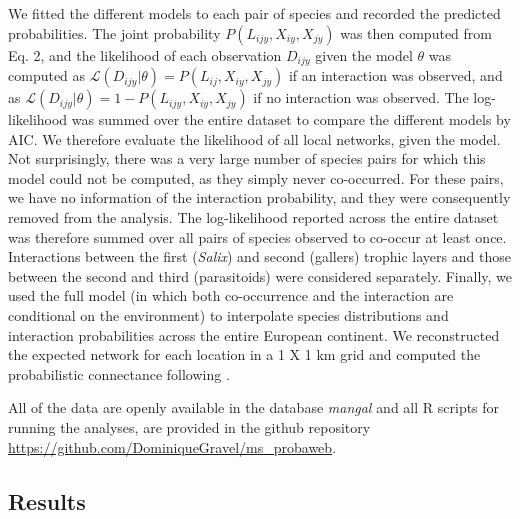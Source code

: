 \documentclass[12pt]{article}
\begin{document}
We fitted the different models to each pair of species and recorded the
predicted probabilities. The joint probability $P(L_{ijy},X_{iy},X_{jy})$ was
then computed from Eq. 2, and the likelihood of each observation $D_{ijy}$ given the model $\theta$ was computed
as $\mathcal{L}(D_{ijy}|\theta)=P(L_{ij},X_{iy},X_{jy})$ if an
interaction was observed, and as $\mathcal{L}(D_{ijy}|\theta) =
1-P(L_{ijy}, X_{iy}, X_{jy})$ if no interaction was observed. The log-likelihood was summed over the entire dataset to compare the different models
by AIC. We therefore evaluate the likelihood of all local networks, given the
model. Not surprisingly, there was a very large number of species pairs for
which this model could not be computed, as they simply never co-occurred. For
these pairs, we have no information of the interaction probability, and they
were consequently removed from the analysis. The log-likelihood reported
across the entire dataset was therefore summed over all pairs of species observed to co-occur at least once. Interactions between the first (\textit{Salix}) and
second (gallers) trophic layers and those between the second and third
(parasitoids) were considered separately. Finally, we used the full model (in
which both co-occurrence and the interaction are conditional on the
environment) to interpolate species distributions and interaction
probabilities across the entire European continent. We reconstructed the
expected network for each location in a 1 X 1 km grid and computed the
probabilistic connectance following \citet{Poisot2015c}.
 
All of the data are openly available in the database \emph{mangal}
\citep{Poisot2015b} and all R scripts for running the analyses, are provided
in the github repository 
\url{https://github.com/DominiqueGravel/ms_probaweb}.

\subsection*{Results}
\end{document}
